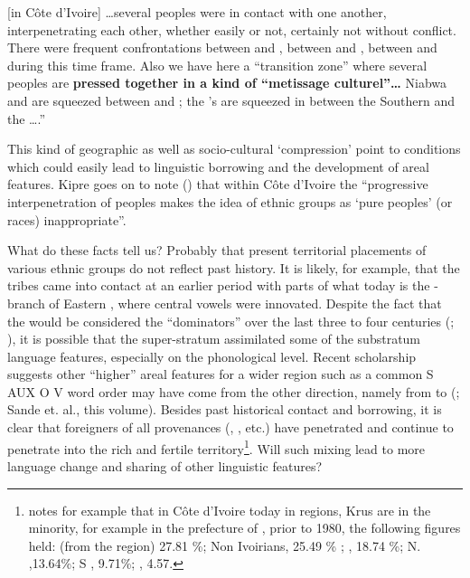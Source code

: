 \documentclass[output=paper
,newtxmath
,modfonts
,nonflat]{langsci/langscibook}
\begin{document}
[in Côte d’Ivoire] …several peoples were in contact with one another, interpenetrating each other, whether easily or not, certainly not without conflict.  There were frequent confrontations between  and , between  and , between  and  during this time frame. Also we have here a “transition zone” where several peoples are \textbf{pressed together in a kind of “metissage culturel”…} Niabwa and  are squeezed between  and ; the ’s are squeezed in between the Southern  and the ….”


This kind of geographic as well as socio-cultural ‘compression’ point to conditions which could easily lead to linguistic borrowing and the development of areal features.  Kipre goes on to note (\citeyear[69]{kipre2005}) that within Côte d’Ivoire the “progressive interpenetration of peoples makes the idea of ethnic groups as ‘pure peoples’ (or races) inappropriate”.     


What do these facts tell us?  Probably that present territorial placements of various ethnic groups do not reflect past history. It is likely, for example, that the  tribes came into contact at an earlier period with parts of what today is the - branch of Eastern , where central vowels were innovated. Despite the fact that the  would be considered the “dominators” over the last three to four centuries (\citealt{Lafage1983}; \citealt[108]{Vydrine2009}), it is possible that the  super-stratum assimilated some of the substratum language features, especially on the phonological level.  Recent scholarship suggests other “higher” areal features for a wider region such as a common S AUX O V word order may have come from the other direction, namely from  to  (\citealt{guld08}; Sande et. al., this volume).  Besides past historical contact and borrowing, it is clear that foreigners of all provenances (, , etc.) have penetrated and continue to penetrate into the rich and fertile  territory\footnote{\citet[54]{Lafage1983} notes for example that in Côte d’Ivoire today in  regions, Krus are in the minority, for example in the prefecture of , prior to 1980,  the following figures held:   (from the region) 27.81 \%; Non Ivoirians, 25.49 \% ; , 18.74 \%; N. ,13.64\%; S , 9.71\%; , 4.57.}.  Will such mixing lead to more language change and sharing of other linguistic features? 
\end{document}
